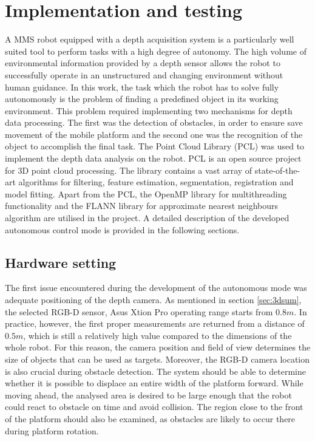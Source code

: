 \chapter{Implementation and testing}
\label{cha:implandtest}

A MMS robot equipped with a depth acquisition system is a particularly well suited tool to perform tasks with a high degree of autonomy. The high volume of environmental information provided by a depth sensor allows the robot to successfully operate in an unstructured and changing environment without human guidance. In this work, the task which the robot has to solve fully autonomously is the problem of finding a predefined object in its working environment. This problem required implementing two mechanisms for depth data processing. The first was the detection of obstacles, in order to ensure save movement of the mobile platform and the second one was the recognition of the object to accomplish the final task. The Point Cloud Library (PCL) \cite{Rusu_ICRA2011_PCL, pcl} was used to implement the depth data analysis on the robot. PCL is an open source project for 3D point cloud processing. The library contains a vast array of state-of-the-art algorithms for filtering, feature estimation, segmentation, registration and model fitting. Apart from the PCL, the OpenMP \cite{openmp} library for multithreading functionality and the FLANN \cite{flann} library for approximate nearest neighbours algorithm are utilised in the project. A detailed description of the developed autonomous control mode is provided in the following sections.


\section{Hardware setting}
\label{sec:setting}

The first issue encountered during the development of the autonomous mode was adequate positioning of the depth camera. As mentioned in section \ref{sec:3dsum}, the selected RGB-D sensor, Asus Xtion Pro operating range starts from $0.8m$. In practice, however, the first proper measurements are returned from a distance of $0.5m$, which is still a relatively high value compared to the dimensions of the whole robot. For this reason, the camera position and field of view determines the size of objects that can be used as targets. Moreover, the RGB-D camera location is also crucial during obstacle detection. The system should be able to determine whether it is possible to displace an entire width of the platform forward. While moving ahead, the analysed area is desired to be large enough that the robot could react to obstacle on time and avoid collision. The region close to the front of the platform should also be examined, as obstacles are likely to occur there during platform rotation.


